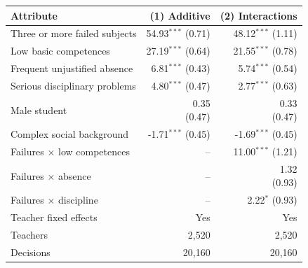 \begin{tabular}{p{6.4cm}rr}
\toprule
Attribute & (1) Additive & (2) Interactions \\
\midrule
Three or more failed subjects & \shortstack{54.93$^{***}$\\{\scriptsize (0.71)}} & \shortstack{48.12$^{***}$\\{\scriptsize (1.11)}} \\
Low basic competences & \shortstack{27.19$^{***}$\\{\scriptsize (0.64)}} & \shortstack{21.55$^{***}$\\{\scriptsize (0.78)}} \\
Frequent unjustified absence & \shortstack{6.81$^{***}$\\{\scriptsize (0.43)}} & \shortstack{5.74$^{***}$\\{\scriptsize (0.54)}} \\
Serious disciplinary problems & \shortstack{4.80$^{***}$\\{\scriptsize (0.47)}} & \shortstack{2.77$^{***}$\\{\scriptsize (0.63)}} \\
Male student & \shortstack{0.35\\{\scriptsize (0.47)}} & \shortstack{0.33\\{\scriptsize (0.47)}} \\
Complex social background & \shortstack{-1.71$^{***}$\\{\scriptsize (0.45)}} & \shortstack{-1.69$^{***}$\\{\scriptsize (0.45)}} \\
Failures $\times$ low competences & -- & \shortstack{11.00$^{***}$\\{\scriptsize (1.21)}} \\
Failures $\times$ absence & -- & \shortstack{1.32\\{\scriptsize (0.93)}} \\
Failures $\times$ discipline & -- & \shortstack{2.22$^{*}$\\{\scriptsize (0.93)}} \\
Teacher fixed effects & Yes & Yes \\
Teachers & 2,520 & 2,520 \\
Decisions & 20,160 & 20,160 \\
\bottomrule
\end{tabular}
